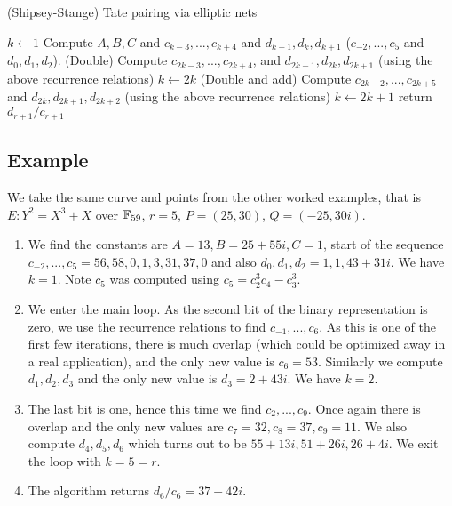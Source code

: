 \begin{algorithm}
\caption{(Shipsey-Stange) Tate pairing via elliptic nets}
\begin{algorithmic}[1]
\STATE $k \gets 1$
\STATE
Compute $A, B, C$ and $c_{k-3},...,c_{k+4}$ and $d_{k-1}, d_k, d_{k+1}$
($c_{-2}, ..., c_{5}$ and $ d_0, d_1, d_2$).
    \STATE (Double)
Compute $c_{2k-3},...,c_{2k+4}$, and $d_{2k-1}, d_{2k}, d_{2k+1}$
(using the above recurrence relations)
    \STATE $k \gets 2k$
    \ELSE[$r_j = 1$]
    \STATE (Double and add)
Compute $c_{2k-2},...,c_{2k+5}$ and  $d_{2k}, d_{2k+1}, d_{2k+2}$
(using the above recurrence relations)
\STATE $k \gets 2k + 1$
    \ENDIF
\ENDFOR
\STATE return $d_{r+1}/c_{r+1}$
\end{algorithmic}
\end{algorithm}

\subsection {Example}
We take the same curve and points from the other worked examples, that is
$E : Y^2 = X^3 + X$ over $\mathbb{F}_{59}$, $r = 5$,
$P = (25, 30)$, $Q = (-25, 30i)$.

\begin{enumerate}
\item
We find the constants are $A = 13, B = 25+55i, C = 1$,
start of the sequence $c_{-2}, ..., c_5 = 
56, 58, 0, 1, 3, 31, 37, 0$ and also $d_0, d_1, d_2 = 1, 1, 43+31i$.
We have $k = 1$. Note $c_5$ was computed using
$c_5 = c_2^3 c_4 - c_3^3$.
\item
We enter the main loop. As the second bit of the binary representation is
zero, we use the recurrence relations to find
$c_{-1}, ..., c_6$. As this is one of the first few iterations,
there is much overlap (which could be optimized away
in a real application), and the only new value is $c_6 = 53$. Similarly
we compute $d_1,d_2,d_3$ and the only new value is $d_3 = 2+43i$.
We have $k = 2$.
\item
The last bit is one, hence this time we find
$c_2, ..., c_9$. Once again there is overlap and the only new values
are $c_7 = 32, c_8 = 37, c_9 = 11$.
We also compute $d_4, d_5, d_6$ which turns out to be $55+13i, 51+26i, 26+4i$.
We exit the loop with $k = 5 = r$.
\item
The algorithm returns $d_6/c_6 = 37+42i$.
\end{enumerate}

